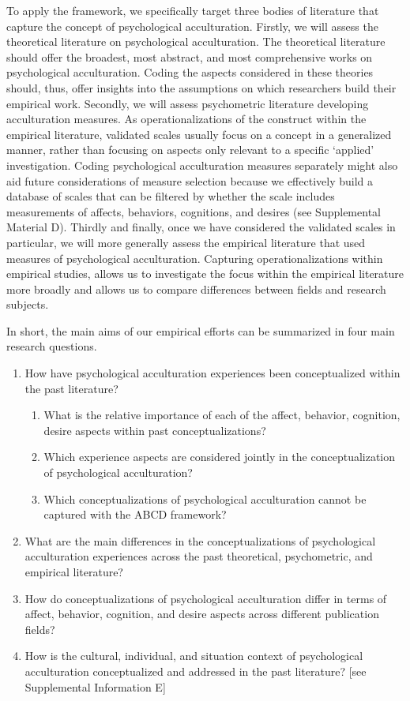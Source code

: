\documentclass[man, 12pt, a4paper, mask]{apa7}
\begin{document}
To apply the framework, we specifically target three bodies of literature that capture the concept of psychological acculturation. Firstly, we will assess the theoretical literature on psychological acculturation. The theoretical literature should offer the broadest, most abstract, and most comprehensive works on psychological acculturation. Coding the aspects considered in these theories should, thus, offer insights into the assumptions on which researchers build their empirical work.
Secondly, we will assess psychometric literature developing acculturation measures. As operationalizations of the construct within the empirical literature, validated scales usually focus on a concept in a generalized manner, rather than focusing on aspects only relevant to a specific `applied' investigation. Coding psychological acculturation measures separately might also aid future considerations of measure selection because we effectively build a database of scales that can be filtered by whether the scale includes measurements of affects, behaviors, cognitions, and desires (see Supplemental Material D). 
Thirdly and finally, once we have considered the validated scales in particular, we will more generally assess the empirical literature that used measures of psychological acculturation. Capturing operationalizations within empirical studies, allows us to investigate the focus within the empirical literature more broadly and allows us to compare differences between fields and research subjects.

In short, the main aims of our empirical efforts can be summarized in four main research questions.
\begin{enumerate}[noitemsep,topsep=0pt,label=RQ \arabic*:,leftmargin=1.8cm]
    \item How have psychological acculturation experiences been conceptualized within the past literature?
    \begin{enumerate}[noitemsep,topsep=0pt,label=(RQ 1\alph*):,leftmargin=1.64cm]
        \item What is the relative importance of each of the affect, behavior, cognition, desire aspects within past conceptualizations?
        \item Which experience aspects are considered jointly in the conceptualization of psychological acculturation?
        \item Which conceptualizations of psychological acculturation cannot be captured with the ABCD framework?
    \end{enumerate}
    \item What are the main differences in the conceptualizations of psychological acculturation experiences across the past theoretical, psychometric, and empirical literature?
    \item How do conceptualizations of psychological acculturation differ in terms of affect, behavior, cognition, and desire aspects across different publication fields?
    \item How is the cultural, individual, and situation context of psychological acculturation conceptualized and addressed in the past literature? [see Supplemental Information E]
\end{enumerate}
\end{document}
